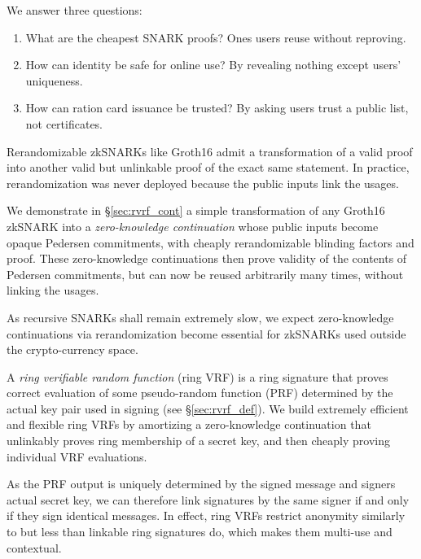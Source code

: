 
We answer three questions:
\begin{enumerate}
\item
What are the cheapest SNARK proofs?  \quad
Ones users reuse without reproving.
\item
How can identity be safe for online use?  \quad
By revealing nothing except users' uniqueness.
\item
How can ration card issuance be trusted?  \quad
By asking users trust a public list, not certificates.
\end{enumerate}


Rerandomizable zkSNARKs like Groth16 \cite{Groth16} admit a
transformation of a valid proof into another valid but unlinkable
proof of the exact same statement.  In practice, rerandomization
was never deployed because the public inputs link the usages.

We demonstrate in \S\ref{sec:rvrf_cont} a simple transformation of
any Groth16 zkSNARK into a {\it zero-knowledge continuation} whose
public inputs become opaque Pedersen commitments, with cheaply
rerandomizable blinding factors and proof.
These zero-knowledge continuations then prove validity of the contents
of Pedersen commitments, but can now be reused arbitrarily many times,
without linking the usages. 

As recursive SNARKs shall remain extremely slow,
we expect zero-knowledge continuations via rerandomization become
essential for zkSNARKs used outside the crypto-currency space.

\smallskip 

A {\it ring verifiable random function} (ring VRF) is a ring signature
that proves correct evaluation of some pseudo-random function (PRF)
determined by the actual key pair used in signing (see \S\ref{sec:rvrf_def}).
We build extremely efficient and flexible ring VRFs by amortizing a
zero-knowledge continuation that unlinkably proves ring membership
of a secret key, and then cheaply proving individual VRF evaluations.

As the PRF output is uniquely determined by the signed message and
signers actual secret key, we can therefore link signatures by the
same signer if and only if they sign identical messages.
In effect, ring VRFs restrict anonymity similarly to but less than
 linkable ring signatures do, which makes them multi-use and contextual.

